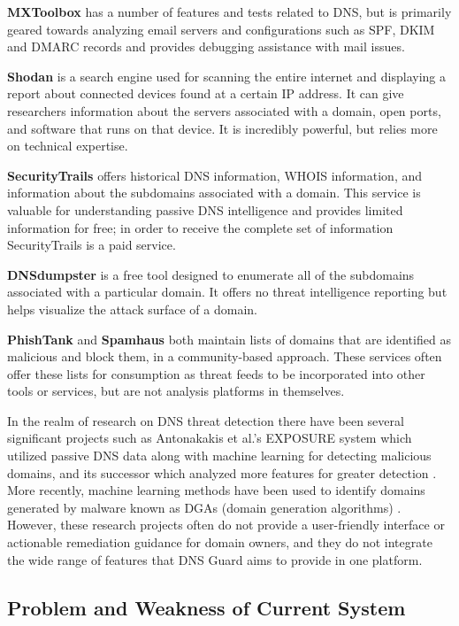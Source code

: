 \documentclass[12pt, a4paper, oneside]{report}
\begin{document}
\textbf{MXToolbox} \cite{mxtoolbox2024} has a number of features and tests related to DNS, but is primarily geared towards analyzing email servers and configurations such as SPF, DKIM and DMARC records and provides debugging assistance with mail issues.

\textbf{Shodan} \cite{shodan2024} is a search engine used for scanning the entire internet and displaying a report about connected devices found at a certain IP address. It can give researchers information about the servers associated with a domain, open ports, and software that runs on that device. It is incredibly powerful, but relies more on technical expertise.

\textbf{SecurityTrails} \cite{securitytrails2024} offers historical DNS information, WHOIS information, and information about the subdomains associated with a domain. This service is valuable for understanding passive DNS intelligence and provides limited information for free; in order to receive the complete set of information SecurityTrails is a paid service.

\textbf{DNSdumpster} \cite{dnsdumpster2024} is a free tool designed to enumerate all of the subdomains associated with a particular domain. It offers no threat intelligence reporting but helps visualize the attack surface of a domain.

\textbf{PhishTank} \cite{phishtank2024} and \textbf{Spamhaus} \cite{spamhaus2024} both maintain lists of domains that are identified as malicious and block them, in a community-based approach. These services often offer these lists for consumption as threat feeds to be incorporated into other tools or services, but are not analysis platforms in themselves.

In the realm of research on DNS threat detection there have been several significant projects such as Antonakakis et al.'s EXPOSURE system \cite{antonakakis2010exposure} which utilized passive DNS data along with machine learning for detecting malicious domains, and its successor which analyzed more features for greater detection \cite{bilge2011exposure}. More recently, machine learning methods have been used to identify domains generated by malware known as DGAs (domain generation algorithms) \cite{woodbridge2016dga}. However, these research projects often do not provide a user-friendly interface or actionable remediation guidance for domain owners, and they do not integrate the wide range of features that DNS Guard aims to provide in one platform.

\subsection{Problem and Weakness of Current System}
\end{document}
